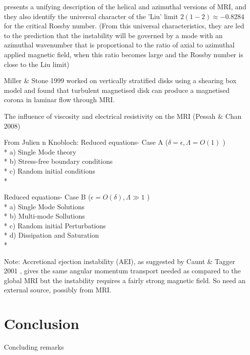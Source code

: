 \documentclass{jfm}
\begin{document}
\cite{Kirillov2012} presents a unifying description of the helical and azimuthal versions of MRI, and they also identify the universal character of the 'Liu' limit $2(1 - 2) \approx - 0.8284$ for the critical Rossby number. (From this universal characteristics, they are led to the prediction that the instability will be governed by a mode with an azimuthal wavenumber that is proportional to the ratio of axial to azimuthal applied magnetic field, when this ratio becomes large and the Rossby number is close to the Liu limit)

Miller \& Stone 1999 \cite{Miller1999} worked on vertically stratified disks using a shearing box model and found that turbulent magnetised disk can produce a magnetised corona in laminar flow through MRI.

The influence of viscosity and electrical resistivity on the MRI (Pessah \& Chan 2008) \cite{Pessah2008}
  
From Julien n Knobloch: Reduced equations- Case A ($ \delta = \epsilon, \Lambda = O(1) $ )\\*
 a) Single Mode theory \\*
 b) Stress-free boundary conditions \\*
 c) Random initial conditions \\*
 
 Reduced equations- Case B ($  \epsilon =O( \delta), \Lambda \gg 1 $ ) \\*
 a) Single Mode Solutions \\*
 b) Multi-mode Sollutions \\*
 c) Random initial Perturbations \\*
 d) Dissipation and Saturation \\*
 
Note: Accretional ejection instability (AEI), as suggested by Caunt \& Tagger 2001 \cite{Caunt2011}, gives the same angular momentum transport needed as compared to the global MRI but the instability requires a fairly strong magnetic field. So need an external source, possibly from MRI.



\section{Conclusion}
Concluding remarks





\end{document}

